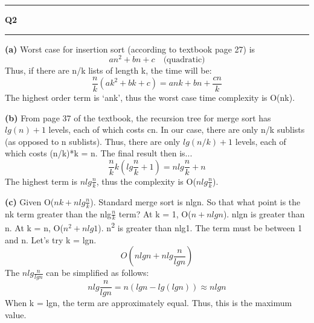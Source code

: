 \documentclass[11pt]{article}
\newcommand\question[2]{\vspace{.25in}\hrule\textbf{#1 #2}\vspace{.5em}\hrule\vspace{.10in}}
\renewcommand\part[1]{\vspace{.10in}\textbf{(#1)}}
\begin{document}
\question{Q2}{}

\part{a} Worst case for insertion sort (according to textbook page 27) is 
\begin{equation*}
an^2 + bn + c \quad \text{(quadratic)}
\end{equation*}
Thus, if there are n/k lists of length k, the time will be:
\begin{equation*}
\frac{n}{k}(ak^2 + bk + c) = ank+bn+\frac{cn}{k}
\end{equation*}
The highest order term is `ank', thus the worst case time complexity is O(nk).

\part{b} From page 37 of the textbook, the recursion tree for merge sort has $lg(n) + 1$ levels, each of which costs cn. In our case, there are only n/k sublists (as opposed to n sublists). Thus, there are only $lg(n/k) + 1$ levels, each of which costs (n/k)*k = n. The final result then is...
\begin{equation*}
\frac{n}{k}k\left(lg\frac{n}{k} + 1\right) = nlg\frac{n}{k} + n
\end{equation*}
The highest term is $nlg\frac{n}{k}$, thus the complexity is O($nlg\frac{n}{k}$).

\part{c} Given O($nk+nlg\frac{n}{k}$). Standard merge sort is nlgn. So that what point is the nk term greater than the nlg$\frac{n}{k}$ term?
\newline
\newline
At k = 1, O($n+nlgn$). nlgn is greater than n.
\newline
\newline
At k = n, O($n^2 + nlg1$). n\textsuperscript{2} is greater than nlg1.
\newline
\newline
The term must be between 1 and n. Let's try k = lgn.
\begin{equation*}
O(nlgn + nlg\frac{n}{lgn})
\end{equation*}
The $nlg\frac{n}{lgn}$ can be simplified as follows:
\begin{equation*}
nlg\frac{n}{lgn} = n(lgn - lg(lgn)) \approx nlgn
\end{equation*}
When k = lgn, the term are approximately equal. Thus, this is the maximum value.
\end{document}
